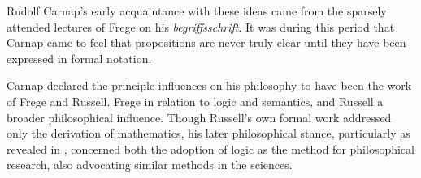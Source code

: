 Rudolf Carnap's early acquaintance with these ideas came from the sparsely attended lectures of Frege on his \emph{begriffsschrift}.
It was during this period that Carnap came to feel that propositions are never truly clear until they have been expressed in formal notation.

Carnap declared the principle influences on his philosophy to have been the work of Frege and Russell.
Frege in relation to logic and semantics, and Russell a broader philosophical influence.
Though Russell's own formal work addressed only the derivation of mathematics, his later philosophical stance, particularly as revealed in \cite{russell21}, concerned both the adoption of logic as the method for philosophical research, also advocating similar methods in the sciences.




